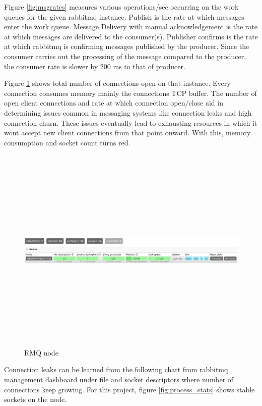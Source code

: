 \noindent
Figure \ref{fig:msgrates} measures various operations/sec occurring on the work queues for the given rabbitmq instance. Publish is the rate at which messages enter the work queue. Message Delivery with manual
acknowledgement is the rate at which messages are delivered to the consumer(s). Publisher confirms is the
rate at which rabbitmq is confirming messages published by the producer. Since the consumer carries out
the processing of the message compared to the producer, the consumer rate is slower by 200 ms to that of
producer.

\pagebreak

\noindent
Figure \ref{fig:rmqnode} shows total number of connections open on that instance.
Every connection consumes memory mainly the connections TCP buffer. The number of open client connections and rate at which connection open/close aid in determining issues common in messaging systems like connection leaks and high connection churn.
These issues eventually lead to exhausting resources in which it wont accept new
client connections from that point onward. With this, memory consumption and socket count turns red. 

\begin{figure}[h!]
  \centering
  \includegraphics[width=16cm,height=10cm,keepaspectratio]{../media/crawler/rmq_node.png}
  \caption{RMQ node}
  \label{fig:rmqnode}
\end{figure}

\noindent
Connection leaks can be learned from the following chart from rabbitmq management
dashboard under file and socket descriptors where number of connections keep growing. For this project, figure \ref{fig:process_stats} shows stable sockets on the node.

